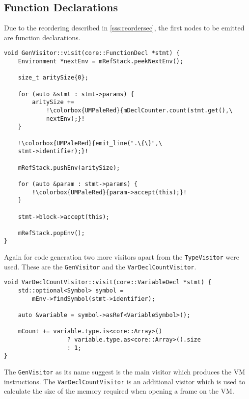 \subsection{Function Declarations}

Due to the reordering described in \ref{sss:reordersec}, the
first nodes to be emitted are function declarations.

\begin{lstlisting}[escapechar=!, caption={The
\texttt{visit(FunctionDecl *)} method in the \texttt{GenVisitor}
class (ir\_gen/GenVisitor.cpp).}, label=lst:genfuncdecl]
void GenVisitor::visit(core::FunctionDecl *stmt) {
    Environment *nextEnv = mRefStack.peekNextEnv();

    size_t aritySize{0};

    for (auto &stmt : stmt->params) {
        aritySize +=
            !\colorbox{UMPaleRed}{mDeclCounter.count(stmt.get(),\
            nextEnv);}!
    }

    !\colorbox{UMPaleRed}{emit_line(".\{\}",\
    stmt->identifier);}!

    mRefStack.pushEnv(aritySize);

    for (auto &param : stmt->params) {
        !\colorbox{UMPaleRed}{param->accept(this);}!
    }

    stmt->block->accept(this);

    mRefStack.popEnv();
}
\end{lstlisting}

Again for code generation two more visitors apart from the
\texttt{TypeVisitor} were used. These are the
\texttt{GenVisitor} and the \texttt{VarDeclCountVisitor}.

\begin{lstlisting}[caption={The \texttt{visit(VariableDecl *)}
method in the \texttt{VarDeclCountVisitor} class
(ir\_gen/VarDeclCountVisitor.cpp)}, label=lst:vardeclcount]
void VarDeclCountVisitor::visit(core::VariableDecl *stmt) {
    std::optional<Symbol> symbol =
        mEnv->findSymbol(stmt->identifier);

    auto &variable = symbol->asRef<VariableSymbol>();

    mCount += variable.type.is<core::Array>()
                  ? variable.type.as<core::Array>().size
                  : 1;
}
\end{lstlisting}

The \texttt{GenVisitor} as its name suggest is the main visitor
which produces the VM instructions. The
\texttt{VarDeclCountVisitor} is an additional visitor which is
used to calculate the size of the memory required when opening a
frame on the VM.


